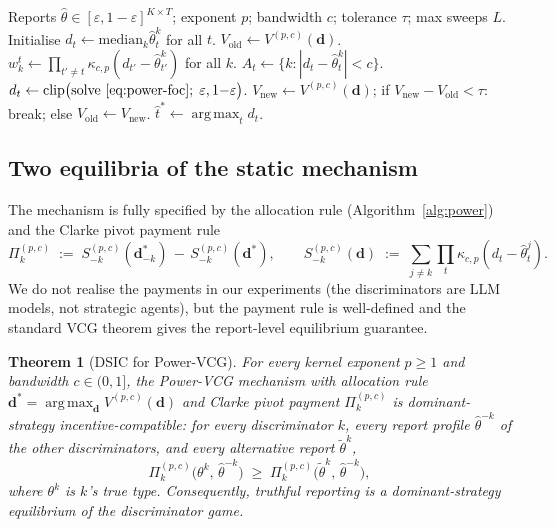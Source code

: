 \documentclass[11pt]{article}
\newtheorem{theorem}{Theorem}
\DeclareMathOperator*{\argmax}{arg\,max}
\newcommand{\thetahat}{\hat{\theta}}
\newcommand{\db}{\bm{d}}
\begin{document}
\begin{algorithm}[H]
\caption{Power-Kernel Multiplicative VCG (Phase 1b, $R = 0$)}
\label{alg:power}
\begin{algorithmic}[1]
\Require Reports $\thetahat \in [\varepsilon, 1{-}\varepsilon]^{K \times T}$; exponent $p$; bandwidth $c$; tolerance $\tau$; max sweeps $L$.
\State Initialise $d_t \gets \mathrm{median}_k \thetahat^k_t$ for all $t$.
\State $V_{\text{old}} \gets V^{(p, c)}(\db)$.
    \State $w_k^t \gets \prod_{t' \neq t} \kappa_{c, p}(d_{t'} - \thetahat^k_{t'})$ for all $k$.
    \State $A_t \gets \{k : |d_t - \thetahat^k_t| < c\}$.
      \State $d_t \gets \mathrm{clip}\big(\text{solve}~\eqref{eq:power-foc};\; \varepsilon, 1{-}\varepsilon\big)$.
    \EndIf
  \EndFor
  \State $V_{\text{new}} \gets V^{(p, c)}(\db)$;
         if $V_{\text{new}} - V_{\text{old}} < \tau$: break; else $V_{\text{old}} \gets V_{\text{new}}$.
\EndFor
\State \Return $\hat t^* \gets \argmax_t d_t$.
\end{algorithmic}
\end{algorithm}

\subsection{Two equilibria of the static mechanism}
\label{sec:two-equilibria}

The mechanism is fully specified by the allocation rule (Algorithm~\ref{alg:power})
and the Clarke pivot payment rule
\[
\Pi_k^{(p,c)} \;:=\; S^{(p,c)}_{-k}(\db^*_{-k}) \,-\, S^{(p,c)}_{-k}(\db^*),
\qquad
S^{(p,c)}_{-k}(\db) \;:=\; \sum_{j \neq k} \prod_t \kappa_{c, p}(d_t - \thetahat^j_t).
\]
We do not realise the payments in our experiments (the discriminators are
LLM models, not strategic agents), but the payment rule is well-defined and
the standard VCG theorem gives the report-level equilibrium guarantee.

\begin{theorem}[DSIC for Power-VCG]
\label{thm:dsic}
For every kernel exponent $p \geq 1$ and bandwidth $c \in (0, 1]$, the
Power-VCG mechanism with allocation rule
$\db^* = \argmax_{\db} V^{(p,c)}(\db)$ and Clarke pivot payment
$\Pi_k^{(p,c)}$ is \emph{dominant-strategy incentive-compatible}: for every
discriminator $k$, every report profile $\thetahat^{-k}$ of the other
discriminators, and every alternative report $\tilde\theta^k$,
\[
\Pi_k^{(p,c)}\!\big(\theta^k,\, \thetahat^{-k}\big)
\;\geq\;
\Pi_k^{(p,c)}\!\big(\tilde\theta^k,\, \thetahat^{-k}\big),
\]
where $\theta^k$ is $k$'s true type. Consequently, truthful reporting is a
dominant-strategy equilibrium of the discriminator game.
\end{theorem}
\end{document}
